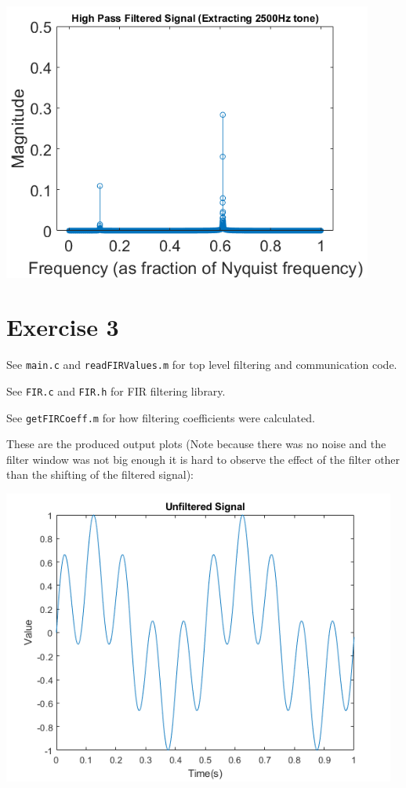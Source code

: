 \documentclass[12pt]{article}
\begin{document}
\begin{center}
    \includegraphics[width=4.8in]{highpass_fir.png}
\end{center}

\section*{Exercise 3}
See \verb|main.c| and \verb|readFIRValues.m| for top level filtering and communication code.

See \verb|FIR.c| and \verb|FIR.h| for FIR filtering library.

See \verb|getFIRCoeff.m| for how filtering coefficients were calculated.

These are the produced output plots (Note because there was no noise and the filter window was not big enough it is hard to observe the effect of the filter other than the shifting of the filtered signal):

\includegraphics[width=5.1in]{3_u.png}
\end{document}
